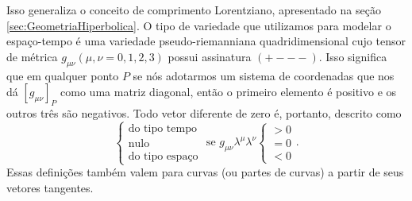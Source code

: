 Isso generaliza o conceito de comprimento Lorentziano, apresentado na seção \ref{sec:GeometriaHiperbolica}.
O tipo de variedade que utilizamos para modelar o espaço-tempo é uma variedade pseudo-riemanniana quadridimensional cujo tensor de métrica $g_{\mu\nu} (\mu,\nu=0,1,2,3)$ possui assinatura $(+---)$. Isso significa que  em qualquer ponto $P$ se nós adotarmos um sistema de coordenadas que nos dá $[g_{\mu\nu}]_P$ como uma matriz diagonal, então o primeiro elemento é positivo e os outros três são negativos. Todo vetor diferente de zero é, portanto, descrito como
\[
\left\{\begin{array}{l}{\text {do tipo tempo}} \\ {\text {nulo}} \\ {\text {do tipo espaço}}\end{array} \text { se } g_{\mu \nu} \lambda^{\mu} \lambda^{\nu}\left\{\begin{array}{l}{>0} \\ {=0} \\ {<0}\end{array}\right.\right. .
\]
Essas definições também valem para curvas (ou partes de curvas) a partir de seus vetores tangentes.